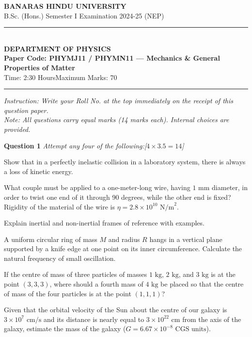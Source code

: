 \documentclass[11pt,a4paper]{article}
\newcommand{\pts}[1]{\hfill\textit{[#1]}}
\begin{document}
\begin{center}
  {\large\bfseries BANARAS HINDU UNIVERSITY}\\[2pt]
  {\normalsize B.Sc. (Hons.) Semester I Examination 2024-25 (NEP)}\\[6pt]
  \rule{0.8\linewidth}{0.5pt}\\[6pt]
  {\large\bfseries DEPARTMENT OF PHYSICS}\\[4pt]
  {\large\bfseries Paper Code: PHYMJ11 / PHYMN11 --- Mechanics \& General Properties of Matter}\\[4pt]
  {\normalsize Time: 2:30 Hours\hfill Maximum Marks: 70}
\end{center}

\rule{\linewidth}{0.4pt}\smallskip
\noindent\textit{Instruction: Write your Roll No. at the top immediately on the receipt of this question paper.}\\[2pt]
\noindent\textit{Note: All questions carry equal marks (14 marks each). Internal choices are provided.}
\bigskip

\noindent\textbf{Question 1} \textit{Attempt any four of the following:}\pts{$4 \times 3.5 = 14$}
\begin{parts}
  \item Show that in a perfectly inelastic collision in a laboratory system, there is always a loss of kinetic energy.
  \item What couple must be applied to a one-meter-long wire, having $1\text{ mm}$ diameter, in order to twist one end of it through 90 degrees, while the other end is fixed? Rigidity of the material of the wire is $\eta = 2.8 \times 10^{10}\text{ N/m}^2$.
  \item Explain inertial and non-inertial frames of reference with examples.
  \item A uniform circular ring of mass $M$ and radius $R$ hangs in a vertical plane supported by a knife edge at one point on its inner circumference. Calculate the natural frequency of small oscillation.
  \item If the centre of mass of three particles of masses $1\text{ kg}$, $2\text{ kg}$, and $3\text{ kg}$ is at the point $(3, 3, 3)$, where should a fourth mass of $4\text{ kg}$ be placed so that the centre of mass of the four particles is at the point $(1, 1, 1)$?
  \item Given that the orbital velocity of the Sun about the centre of our galaxy is $3 \times 10^7\text{ cm/s}$ and its distance is nearly equal to $3 \times 10^{22}\text{ cm}$ from the axis of the galaxy, estimate the mass of the galaxy ($G = 6.67 \times 10^{-8}\text{ CGS units}$).
\end{parts}
\end{document}
